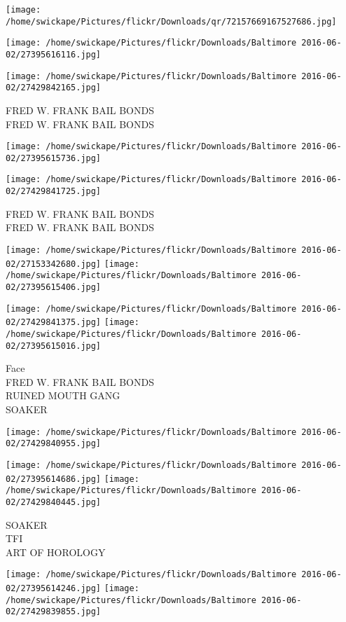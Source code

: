 \documentclass[10pt,letterpaper]{article}
\begin{document}
\texttt{[image: /home/swickape/Pictures/flickr/Downloads/qr/72157669167527686.jpg]}
\pagebreak

\texttt{[image: /home/swickape/Pictures/flickr/Downloads/Baltimore 2016-06-02/27395616116.jpg]}

\vspace{0.25in}
\texttt{[image: /home/swickape/Pictures/flickr/Downloads/Baltimore 2016-06-02/27429842165.jpg]}

FRED W. FRANK BAIL BONDS\\
FRED W. FRANK BAIL BONDS
\pagebreak

\texttt{[image: /home/swickape/Pictures/flickr/Downloads/Baltimore 2016-06-02/27395615736.jpg]}

\vspace{0.25in}
\texttt{[image: /home/swickape/Pictures/flickr/Downloads/Baltimore 2016-06-02/27429841725.jpg]}

FRED W. FRANK BAIL BONDS\\
FRED W. FRANK BAIL BONDS
\pagebreak

\texttt{[image: /home/swickape/Pictures/flickr/Downloads/Baltimore 2016-06-02/27153342680.jpg]}
\texttt{[image: /home/swickape/Pictures/flickr/Downloads/Baltimore 2016-06-02/27395615406.jpg]}

\texttt{[image: /home/swickape/Pictures/flickr/Downloads/Baltimore 2016-06-02/27429841375.jpg]}
\texttt{[image: /home/swickape/Pictures/flickr/Downloads/Baltimore 2016-06-02/27395615016.jpg]}

Face\\
FRED W. FRANK BAIL BONDS\\
RUINED MOUTH GANG\\
SOAKER
\pagebreak

\texttt{[image: /home/swickape/Pictures/flickr/Downloads/Baltimore 2016-06-02/27429840955.jpg]}

\vspace{0.25in}
\texttt{[image: /home/swickape/Pictures/flickr/Downloads/Baltimore 2016-06-02/27395614686.jpg]}
\texttt{[image: /home/swickape/Pictures/flickr/Downloads/Baltimore 2016-06-02/27429840445.jpg]}

SOAKER\\
TFI\\
ART OF HOROLOGY
\pagebreak

\texttt{[image: /home/swickape/Pictures/flickr/Downloads/Baltimore 2016-06-02/27395614246.jpg]}
\texttt{[image: /home/swickape/Pictures/flickr/Downloads/Baltimore 2016-06-02/27429839855.jpg]}
\end{document}
